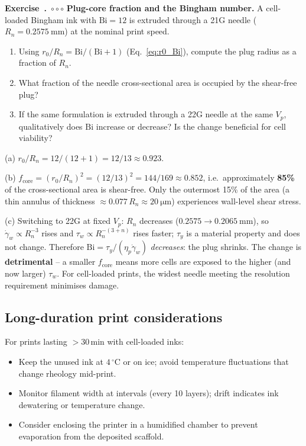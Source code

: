 \documentclass[11pt,a4paper]{article}
\newcommand{\diffC}{\textcolor{red!70!black}{$\circ\circ\circ$}}
\newcounter{exidx}[section]
\renewcommand{\theexidx}{\thesection.\arabic{exidx}}
\newenvironment{exercise}[1]%
  {\par\smallskip\refstepcounter{exidx}%
   \noindent\textbf{Exercise~\theexidx}~#1\quad}
  {\par\smallskip}
\newcommand{\gd}{\dot{\gamma}}
\newcommand{\Bi}{\mathrm{Bi}}
\begin{document}
\begin{exercise}{\diffC}
\textbf{Plug-core fraction and the Bingham number.}
A cell-loaded Bingham ink with $\Bi=12$ is extruded through a 21G needle
($R_n=\SI{0.2575}{\mm}$) at the nominal print speed.
\begin{enumerate}[label=(\alph*),leftmargin=1.6em,itemsep=1pt]
  \item Using $r_0/R_n=\Bi/(\Bi+1)$ (Eq.~\ref{eq:r0_Bi}), compute the
    plug radius as a fraction of $R_n$.
  \item What fraction of the needle cross-sectional area is occupied by
    the shear-free plug?
  \item If the same formulation is extruded through a 22G needle at the
    same $V_p$, qualitatively does $\Bi$ increase or decrease?  Is the
    change beneficial for cell viability?
\end{enumerate}
\begin{solution}
(a) $r_0/R_n = 12/(12+1) = 12/13 \approx 0.923$.

(b) $f_\mathrm{core} = (r_0/R_n)^2 = (12/13)^2 = 144/169
    \approx 0.852$, i.e.\ approximately \textbf{85\%} of the
    cross-sectional area is shear-free.  Only the outermost 15\% of the
    area (a thin annulus of thickness $\approx0.077\,R_n\approx
    \SI{20}{\micro\m}$) experiences wall-level shear stress.

(c) Switching to 22G at fixed $V_p$: $R_n$ decreases
($0.2575\to\SI{0.2065}{\mm}$), so $\gd_w\propto R_n^{-3}$ rises
and $\tau_w\propto R_n^{-(3+n)}$ rises faster; $\tau_y$ is a material
property and does not change.  Therefore
$\Bi=\tau_y/(\eta_p\gd_w)$ \emph{decreases}: the plug shrinks.
The change is \textbf{detrimental} -- a smaller $f_\mathrm{core}$
means more cells are exposed to the higher (and now larger) $\tau_w$.
For cell-loaded prints, the widest needle meeting the resolution
requirement minimises damage.
\end{solution}
\end{exercise}

\subsection{Long-duration print considerations}

For prints lasting $>30\,\si{\minute}$ with cell-loaded inks:
\begin{itemize}[leftmargin=1.6em,itemsep=2pt]
\item Keep the unused ink at $4\,^\circ$C or on ice; avoid temperature
  fluctuations that change rheology mid-print.
\item Monitor filament width at intervals (every 10 layers); drift
  indicates ink dewatering or temperature change.
\item Consider enclosing the printer in a humidified chamber to prevent
  evaporation from the deposited scaffold.
\end{itemize}
\end{document}
